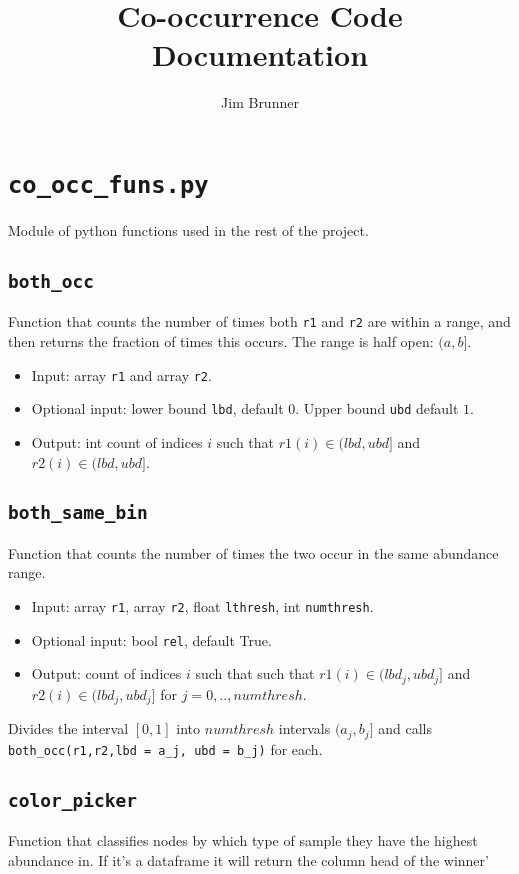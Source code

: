 \documentclass[10pt]{article}
\author{Jim Brunner}
\title{Co-occurrence Code Documentation}
\theoremstyle{definition}
\numberwithin{theorem}{section}
\numberwithin{definition}{section}
\numberwithin{lemma}{section}
\numberwithin{corollary}{section}
\numberwithin{clm}{section}
\numberwithin{rmk}{section}
\begin{document}
\maketitle

\tableofcontents

\cprotect \section{\verb|co_occ_funs.py|}
Module of python functions used in the rest of the project.
\cprotect \subsection{\verb|both_occ|}
Function that counts the number of times both \verb|r1| and \verb|r2| are within a range, and then 
returns the fraction of times this occurs. The range is half open: $(a,b]$.
\begin{itemize}
	\item Input: array \verb|r1| and array \verb|r2|.
	\item Optional input: lower bound \verb|lbd|, default $0$. Upper bound \verb|ubd| default $1$.
	\item Output: int count of indices $i$ such that $r1(i) \in (lbd, ubd]$ and $r2(i) \in (lbd, ubd]$.
\end{itemize}

\cprotect \subsection{\verb|both_same_bin|}
Function that counts the number of times the two occur in the same abundance range.
\begin{itemize}
	\item Input: array \verb|r1|, array \verb|r2|, float \verb|lthresh|, int \verb|numthresh|.
	\item Optional input: bool \verb|rel|, default True.
	\item Output: count of indices $i$ such that such that $r1(i) \in (lbd_j, ubd_j]$ and $r2(i) \in (lbd_j, ubd_j]$ for $j = 0,..,numthresh$.
\end{itemize}

Divides the interval $[0,1]$ into $numthresh$ intervals $(a_j,b_j]$ and calls \verb|both_occ(r1,r2,lbd = a_j, ubd = b_j)| for each. 

\cprotect \subsection{\verb|color_picker|}
Function that classifies nodes by which type of sample they have the highest abundance in. If it's a dataframe it will return the column head of the winner'
\end{document}

